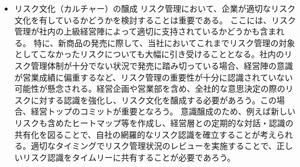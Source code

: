 \documentclass[report,gutter=10mm,fore-edge=10mm,uplatex,dvipdfmx]{jlreq}
\begin{document}
\begin{itemize}
\item[] リスク文化（カルチャー）の醸成
リスク管理において、企業が適切なリスク文化を有しているかどうかを検討することは重要である。
ここには、リスク管理が社内の上級経営陣によって適切に支持されているかどうかも含まれる。
特に、新商品の発売に際して、当社においてこれまでリスク管理の対象としてこなかったリスクについても大幅に引き受けることとなる。社内のリスク管理体制が十分でない状況で発売に踏み切っている場合、経営陣の意識が営業成績に偏重するなど、リスク管理の重要性が十分に認識されていない可能性が懸念される。経営企画や営業部を含め、全社的な意思決定の際のリスクに対する認識を強化し、リスク文化を醸成する必要があろう。この場合、経営トップのコミットが重要となろう。
意識醸成のため、例えば新しいリスクも含めたヒートマップ等を作成し、経営層との定期的な対話・認識の共有化を図ることで、自社の網羅的なリスク認識を確立することが考えられる。適切なタイミングでリスク管理状況のレビューを実施することで、正しいリスク認識をタイムリーに共有することが必要であろう。
\end{itemize}
\end{document}
